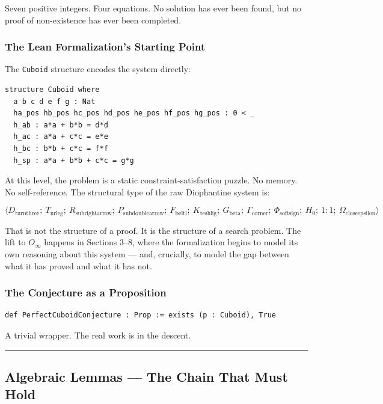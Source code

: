 \documentclass[12pt,a4paper]{article}
\begin{document}
Seven positive integers. Four equations. No solution has ever been found, but no proof of non-existence has ever been completed.

\subsubsection{The Lean Formalization's Starting Point}

The \texttt{Cuboid} structure encodes the system directly:

\begin{lstlisting}[language=lean]
structure Cuboid where
  a b c d e f g : Nat
  ha_pos hb_pos hc_pos hd_pos he_pos hf_pos hg_pos : 0 < _
  h_ab : a*a + b*b = d*d
  h_ac : a*a + c*c = e*e
  h_bc : b*b + c*c = f*f
  h_sp : a*a + b*b + c*c = g*g
\end{lstlisting}

At this level, the problem is a static constraint-satisfaction puzzle. No memory. No self-reference. The structural type of the raw Diophantine system is:

\[\langle D_{\text{turnthree}};\ T_{\text{nrleg}};\ R_{\text{subrightarrow}};\ P_{\text{subdoublearrow}};\ F_{\text{beltl}};\ K_{\text{teshlig}};\ G_{\text{beta}};\ \Gamma_{\text{corner}};\ \Phi_{\text{softsign}};\ H_0;\ 1{:}1;\ \Omega_{\text{closeepsilon}} \rangle\]

That is not the structure of a proof. It is the structure of a search problem. The lift to $O_{\infty}$ happens in Sections 3--8, where the formalization begins to model its own reasoning about this system --- and, crucially, to model the gap between what it has proved and what it has not.

\subsubsection{The Conjecture as a Proposition}

\begin{lstlisting}[language=lean]
def PerfectCuboidConjecture : Prop := exists (p : Cuboid), True
\end{lstlisting}

A trivial wrapper. The real work is in the descent.

\begin{center}
\rule{0.5\textwidth}{0.4pt}
\end{center}

\subsection{Algebraic Lemmas --- The Chain That Must Hold}
\end{document}
